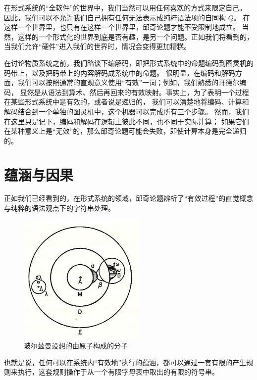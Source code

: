 \documentclass[a4paper,12pt]{article}
\begin{document}
在\gls{形式系统}的“全\gls{软件}”的世界中，我们当然可以用任何喜欢的方式来限定自己。
因此，我们可以不允许我们自己拥有任何无法表示成纯粹\gls{语法项}的自同构 $Q$。
在这样一个世界里，也只有在这样一个世界里，\gls{邱奇论题}才能不受限制地成立。
当然，这样的一个\gls{形式化}的世界到底是否有趣，是另一个问题。正如我们将看到的，当我们允许“\gls{硬件}”进入我们的世界时，情况会变得更加糟糕。

在讨论\gls{物质系统}之前，我们略谈下编解码，即把\gls{形式系统}中的\gls{命题}\gls{编码}到\gls{图灵机}的码带上，以及把码带上的内容\gls{解码}成系统中的\gls{命题}。
很明显，在\gls{编码}和\gls{解码}方面，我们可以按照通常的直观意义使用“有效”一词；例如，我们熟悉的\gls{哥德尔编码}，
显然是从\gls{语法}到算术、然后再回来的有效映射。事实上，为了表明一个过程在某些\gls{形式系统}中是有效的，或者说是递归的，
我们可以清楚地将\gls{编码}、计算和\gls{解码}结合到一个单独的\gls{图灵机}中，这个机器可以完成所有三个步骤。
然而，我们在这里只是记下，\gls{编码}和\gls{解码}在\gls{逻辑}上彼此不同，也不同于实际计算；
如果它们在某种意义上是“无效”的，那么\gls{邱奇论题}可能会失败，即使计算本身是完全递归的。

\section{蕴涵与因果}

正如我们已经看到的，在\gls{形式系统}的领域，\gls{邱奇论题}辨析了“\gls{有效过程}”的直觉概念与纯粹的\gls{语法}观点下的\gls{字符串处理}。

\begin{figure}[ht]
\centering
\includegraphics[height=2.5in]{images/boltzmanns_molecule.jpg}
\caption{玻尔兹曼设想的由原子构成的分子}
\end{figure}

也就是说，任何可以在系统内“有效地”执行的\gls{蕴涵}，都可以通过一套有限的产生规则来执行，这套规则操作于从一个有限字母表中取出的有限的符号串。
\end{document}
